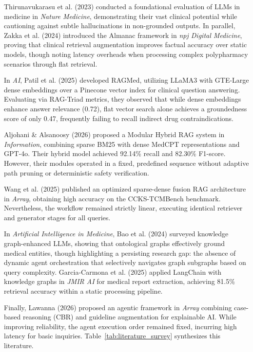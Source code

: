 \documentclass[conference]{IEEEtran}
\begin{document}
Thirunavukarasu et al. (2023) \cite{THIRUNAVUKARASU2023} conducted a foundational evaluation of LLMs in medicine in \textit{Nature Medicine}, demonstrating their vast clinical potential while cautioning against subtle hallucinations in non-grounded outputs. In parallel, Zakka et al. (2024) \cite{ZAKKA2024} introduced the Almanac framework in \textit{npj Digital Medicine}, proving that clinical retrieval augmentation improves factual accuracy over static models, though noting latency overheads when processing complex polypharmacy scenarios through flat retrieval.

In \textit{AI}, Patil et al. (2025) \cite{ai6100240} developed RAGMed, utilizing LLaMA3 with GTE-Large dense embeddings over a Pinecone vector index for clinical question answering. Evaluating via RAG-Triad metrics, they observed that while dense embeddings enhance answer relevance (0.72), flat vector search alone achieves a groundedness score of only 0.47, frequently failing to recall indirect drug contraindications.

Aljohani \& Alsanoosy (2026) \cite{info17020133} proposed a Modular Hybrid RAG system in \textit{Information}, combining sparse BM25 with dense MedCPT representations and GPT-4o. Their hybrid model achieved 92.14\% recall and 82.30\% F1-score. However, their modules operated in a fixed, predefined sequence without adaptive path pruning or deterministic safety verification.

Wang et al. (2025) \cite{WANG2025100504} published an optimized sparse-dense fusion RAG architecture in \textit{Array}, obtaining high accuracy on the CCKS-TCMBench benchmark. Nevertheless, the workflow remained strictly linear, executing identical retriever and generator stages for all queries.

In \textit{Artificial Intelligence in Medicine}, Bao et al. (2024) \cite{BAO2024102768} surveyed knowledge graph-enhanced LLMs, showing that ontological graphs effectively ground medical entities, though highlighting a persisting research gap: the absence of dynamic agent orchestration that selectively navigates graph subgraphs based on query complexity. Garcia-Carmona et al. (2025) \cite{GARCIACARMONA2025} applied LangChain with knowledge graphs in \textit{JMIR AI} for medical report extraction, achieving 81.5\% retrieval accuracy within a static processing pipeline.

Finally, Lawanna (2026) \cite{LAWANNA2026100926} proposed an agentic framework in \textit{Array} combining case-based reasoning (CBR) and guideline augmentation for explainable AI. While improving reliability, the agent execution order remained fixed, incurring high latency for basic inquiries. Table~\ref{tab:literature_survey} synthesizes this literature.
\end{document}
